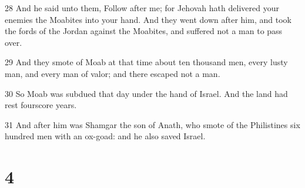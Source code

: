 \par 28 And he said unto them, Follow after me; for Jehovah hath delivered your enemies the Moabites into your hand. And they went down after him, and took the fords of the Jordan against the Moabites, and suffered not a man to pass over.
\par 29 And they smote of Moab at that time about ten thousand men, every lusty man, and every man of valor; and there escaped not a man.
\par 30 So Moab was subdued that day under the hand of Israel. And the land had rest fourscore years.
\par 31 And after him was Shamgar the son of Anath, who smote of the Philistines six hundred men with an ox-goad: and he also saved Israel.

\chapter{4}

